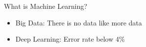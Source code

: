 \documentclass{beamer}{}
\begin{document}
    \begin{frame} {What is Machine Learning?}
        \begin{itemize}[<+->]
            \item Big Data: There is no data like more data
            \item Deep Learning: Error rate below 4\%
        \end{itemize}
    \end{frame}
\end{document}
